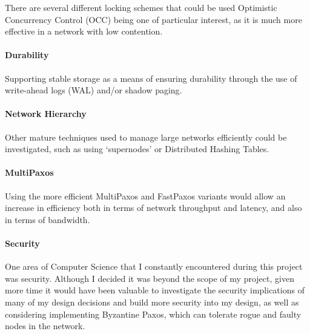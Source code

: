\documentclass[12pt,twoside,notitlepage]{report}
\begin{document}
There are several different locking schemes that could be used Optimistic Concurrency Control
(OCC) being one of particular interest, as it is much more effective in a network with low
contention.

\paragraph{Durability}

Supporting stable storage as a means of ensuring durability through the use of write-ahead logs
(WAL)\cite{burrows06} and/or shadow paging\cite{hitz94}.

\paragraph{Network Hierarchy}

Other mature techniques used to manage large networks efficiently could be investigated, such as
using `supernodes' or Distributed Hashing Tables.

\paragraph{MultiPaxos}

Using the more efficient MultiPaxos and FastPaxos variants would allow an
increase in efficiency both in terms of network throughput and latency, and also in terms of
bandwidth.

\paragraph{Security}

One area of Computer Science that I constantly encountered during this project was security.
Although I decided it was beyond the scope of my project, given more time it would have been
valuable to investigate the security implications of many of my design decisions and build more
security into my design, as well as considering implementing Byzantine Paxos, which can tolerate
rogue and faulty nodes in the network.

\cleardoublepage



\cleardoublepage

\appendix
\end{document}
